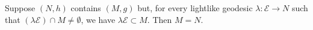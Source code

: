 Suppose $(N, h)$ contains $(M, g)$ but, for every lightlike geodesic $\lambda: \mathcal{E} \rightarrow N$ such that $(\lambda \mathcal{E}) \cap M \neq \emptyset$, we have $\lambda \mathcal{E} \subset M$. Then $M = N$.
